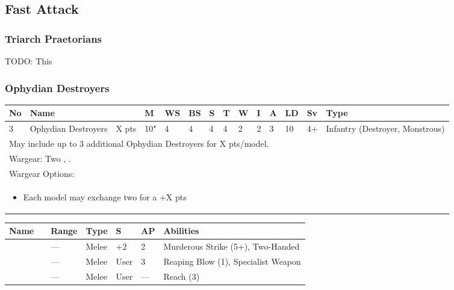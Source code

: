 \newpage
\subsection{Fast Attack}

\subsubsection{Triarch Praetorians}

TODO: This

\newpage
\subsubsection{Ophydian Destroyers}
 
\noindent
\begin{tabular}{||m{10pt} m{95pt} m{30pt} m{11pt} m{11pt} m{11pt} m{11pt} m{11pt} m{11pt} m{11pt} m{11pt} m{11pt} m{11pt} m{125pt}||}
	\hline
	No & Name & & M & WS & BS & S & T & W & I & A & LD & Sv & Type \\
	\hline
	3 & Ophydian Destroyers & X pts & 10" & 4 & 4 & 4 & 4 & 2 & 2 & 3 & 10 & 4+ & Infantry (Destroyer, Monstrous) \\
	\hline
	\hline
	\multicolumn{14}{||Z{532 pt}||}{May include up to 3 additional Ophydian Destroyers for X pts/model.}\\	
	\hline
	\hline
	\multicolumn{14}{||Z{532 pt}||}{Wargear: Two \quickref{Hyperphase Thresher}, \quickref{Whip Coils}.} \\
	\multicolumn{14}{||Z{532 pt}||}{Wargear Options:} \\	\multicolumn{14}{||Z{532 pt}||}{\begin{itemize}
			\item Each model may exchange two \quickref{Hyperphase Thresher} for a \quickref{Hyperphase Reap-Blade} \hrulefill +X pts
	\end{itemize}} \\
	\hline
\end{tabular}

\noindent
\begin{tabular}{||m{110pt} m{30pt} m{31pt} m{55pt} m{12pt} m{12pt} m{210pt}||}
	\hline
	Name & & Range & Type & S & AP & Abilities \\
	\hline
	\quickref{Hyperphase Reap-Blade} &  & — & Melee & +2 & 2 & Murderous Strike (5+), Two-Handed \\
	\quickref{Hyperphase Thresher} &  & — & Melee & User & 3 & Reaping Blow (1), Specialist Weapon \\
	\quickref{Whip Coils} & & — & Melee & User & — & Reach (3) \\
	\hline
\end{tabular}

